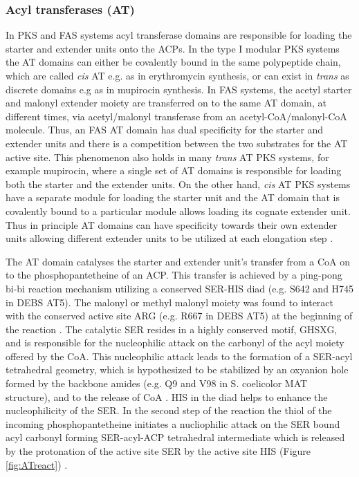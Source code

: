 			\subsubsection{Acyl transferases (AT)}
			\label{sec:AT}
			In PKS and FAS systems acyl transferase domains are responsible for loading the starter and extender units onto the ACPs. In the type I modular PKS systems the AT domains can either be covalently bound in the same polypeptide chain, which are called \textit{cis} AT e.g. as in erythromycin synthesis, or can exist in \textit{trans} as discrete domains e.g as in mupirocin synthesis. In FAS systems, the acetyl starter and malonyl extender moiety are transferred on to the same AT domain, at different times, via acetyl/malonyl transferase from an acetyl-CoA/malonyl-CoA molecule. Thus, an FAS AT domain has dual specificity for the starter and extender units and there is a competition between the two substrates for the AT active site. This phenomenon also holds in many \textit{trans} AT PKS systems, for example mupirocin, where a single set of AT domains is responsible for loading both the starter and the extender units. On the other hand, \textit{cis} AT PKS systems have a separate module for loading the starter unit and the AT domain that is covalently bound to a particular module allows loading its cognate extender unit. Thus in principle AT domains can have specificity towards their own extender units allowing different extender units to be utilized at each elongation step \parencite{Khosla1999}. 
			
			The AT domain catalyses the starter and extender unit's transfer from a  CoA on to the phosphopantetheine of an ACP. This transfer is achieved by a ping-pong bi-bi reaction mechanism utilizing a conserved SER-HIS diad (e.g. S642 and H745 in DEBS AT5). The malonyl or methyl malonyl moiety was found to interact with the conserved active site ARG (e.g. R667 in DEBS AT5) at the beginning of the reaction \parencite{Tang2006}. The catalytic SER resides in  a highly conserved motif, GHSXG, and is responsible for the nucleophilic attack on the carbonyl of the acyl moiety offered by the CoA. This nucleophilic attack leads to the formation of a SER-acyl tetrahedral geometry, which is hypothesized to be stabilized by an oxyanion hole formed by the backbone amides (e.g. Q9 and V98 in S. coelicolor MAT structure), and to the release of CoA \parencite{Keatinge-Clay2003}. HIS in the diad helps to enhance the nucleophilicity of the SER. In the second step of the reaction the thiol of the incoming phosphopantetheine initiates a nucliophilic attack on the SER bound acyl carbonyl forming SER-acyl-ACP tetrahedral intermediate which is released by the protonation of the active site SER by the active site HIS (Figure \ref{fig:ATreact}) \parencite{Tsai2009, Dunn2013}. 
			
